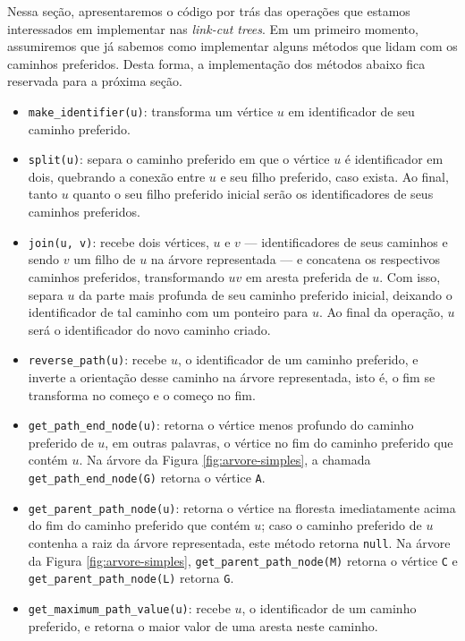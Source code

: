 Nessa seção, apresentaremos o código por trás das operações que estamos interessados em implementar nas \emph{link-cut trees}. Em um primeiro momento, assumiremos que já sabemos como implementar alguns métodos que lidam com os caminhos preferidos. Desta forma, a implementação dos métodos abaixo fica reservada para a próxima seção.

\begin{itemize}
    \item \texttt{make\_identifier(u)}: transforma um vértice $u$ em identificador de seu caminho preferido.
    \item \texttt{split(u)}: separa o caminho preferido em que o vértice $u$ é identificador em dois, quebrando a conexão entre $u$ e seu filho preferido, caso exista. Ao final, tanto $u$ quanto o seu filho preferido inicial serão os identificadores de seus caminhos preferidos.
    \item \texttt{join(u, v)}: recebe dois vértices, $u$ e $v$ --- identificadores de seus caminhos e sendo $v$ um filho de $u$ na árvore representada --- e concatena os respectivos caminhos preferidos, transformando $uv$ em aresta preferida de $u$. Com isso, separa $u$ da parte mais profunda de seu caminho preferido inicial, deixando o identificador de tal caminho com um ponteiro para $u$. Ao final da operação, $u$ será o identificador do novo caminho criado.
    \item \texttt{reverse\_path(u)}: recebe $u$, o identificador de um caminho preferido, e inverte a orientação desse caminho na árvore representada, isto é, o fim se transforma no começo e o começo no fim.
    \item \texttt{get\_path\_end\_node(u)}: retorna o vértice menos profundo do caminho preferido de $u$, em outras palavras, o vértice no fim do caminho preferido que contém $u$. Na árvore da Figura \ref{fig:arvore-simples}, a chamada \texttt{get\_path\_end\_node(G)} retorna o vértice \texttt{A}.
    \item \texttt{get\_parent\_path\_node(u)}: retorna o vértice na floresta imediatamente acima do fim do caminho preferido que contém $u$; caso o caminho preferido de $u$ contenha a raiz da árvore representada, este método retorna \texttt{null}. Na árvore da Figura \ref{fig:arvore-simples}, \texttt{get\_parent\_path\_node(M)} retorna o vértice \texttt{C} e \texttt{get\_parent\_path\_node(L)} retorna \texttt{G}.
    \item \texttt{get\_maximum\_path\_value(u)}: recebe $u$, o identificador de um caminho preferido, e retorna o maior valor de uma aresta neste caminho.
\end{itemize}

